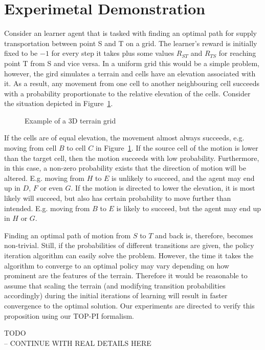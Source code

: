 \documentclass[letterpaper]{aamas2009}
\begin{document}
\section{Experimetal Demonstration}
Consider an learner agent that is tasked with finding an optimal path
for supply transportation between point S and T on a grid. The
learner's reward is initially fixed to be $-1$ for every step it takes
plus some values $R_{ST}$ and $R_{TS}$ for reaching point T from S and
vice versa. In a uniform grid this would be a simple problem, however,
the gird simulates a terrain and cells have an elevation associated
with it. As a result, any movement from one cell to another
neighbouring cell succeeds with a probability proportionate to the
relative elevation of the cells. Consider the situation depicted in Figure~\ref{exp_motion}. 

\begin{figure}[ht]
\centerline{}
\caption{\label{exp_motion}Example of a 3D terrain grid}
\end{figure}

If the cells are of equal elevation, the movement almost always
succeeds, e.g. moving from cell $B$ to cell $C$ in
Figure~\ref{exp_motion}. If the source cell of the motion is lower
than the target cell, then the motion succeeds with low
probability. Furthermore, in this case, a non-zero probability exists
that the direction of motion will be altered. E.g. moving from $H$ to
$E$ is unlikely to succeed, and the agent may end up in $D$, $F$ or
even $G$. If the motion is directed to lower the elevation, it is most
likely will succeed, but also has certain probability to move further
than intended. E.g. moving from $B$ to $E$ is likely to succeed, but
the agent may end up in $H$ or $G$.

Finding an optimal path of motion from $S$ to $T$ and back is,
therefore, becomes non-trivial. Still, if the probabilities of
different transitions are given, the policy iteration algorithm can
easily solve the problem. However, the time it takes the algorithm to
converge to an optimal policy may vary depending on how prominent are
the features of the terrain. Therefore it would be reasonable to
assume that scaling the terrain (and modifying transition
probabilities accordingly) during the initial iterations of learning
will result in faster convergence to the optimal solution. Our
experiments are directed to verify this proposition using our TOP-PI formalism.

{\Large TODO\\ -- CONTINUE WITH REAL DETAILS HERE}
\end{document}
